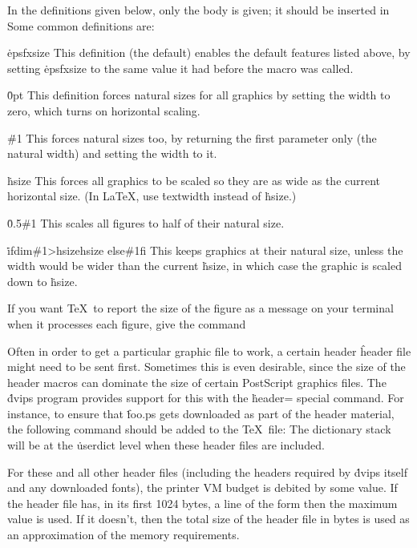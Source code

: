 In the definitions given below, only the body is given; it should be inserted
in
\noindent
Some common definitions are:

{\options
\.{\ttbackslash epsfxsize}
This definition (the default) enables the default features listed above,
by setting \.{\ttbackslash epsfxsize} to the same value it had before
the macro was called.

\.{0pt}
This definition forces natural sizes for all graphics by setting the width to
zero, which turns on horizontal scaling.

\.{\#1}
This forces natural sizes too, by returning the first parameter only
(the natural width) and setting the width to it.

\.{\ttbackslash hsize}
This forces all graphics to be scaled so they are as wide as the current
horizontal size.  (In La\TeX, use \.{\ttbackslash textwidth} instead
of \.{\ttbackslash hsize}.)

\.{0.5\#1}
This scales all figures to half of their natural size.

\.{\ttbackslash ifdim\#1>\ttbackslash hsize\ttbackslash hsize\ttbackslash
else\#1\ttbackslash fi}
This keeps graphics at their natural size, unless the width would be wider
than the current \.{\ttbackslash hsize}, in which case the graphic is
scaled down to \.{\ttbackslash hsize}.\par}

If you want \TeX\ to report the size of the figure as a message
on your terminal when it processes each figure, give the command


Often in order to get a particular graphic file to work, a certain header
\^{header}
file might need to be sent first.  Sometimes this is even desirable, since
the size of the header macros can dominate the size of certain PostScript
graphics files.  The \.{dvips} program provides support for this with the
\.{header=} special command.  For instance, to ensure that \.{foo.ps}
gets downloaded as part of the header material, the following command
should be added to the \TeX\ file:
\noindent
The dictionary stack will be at the \.{userdict} level when these header
files are included.

For these and all other header files (including the headers required
by \.{dvips} itself and any downloaded fonts), the printer VM budget is
debited by some value.  If the header file has, in its first 1024 bytes,
a line of the form
\noindent
then the maximum value is used.  If it doesn't, then the total size of
the header file in bytes is used as an approximation of the memory
requirements.

